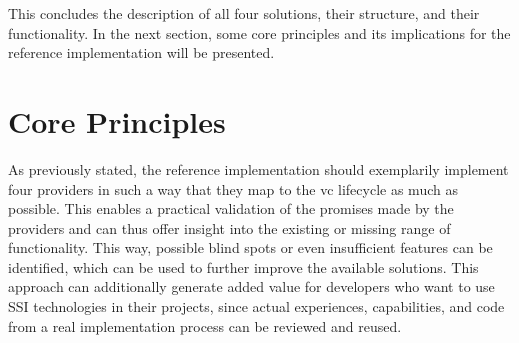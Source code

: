     This concludes the description of all four solutions, their structure, and their functionality. In the next section, some core principles and its implications for the reference implementation will be presented.
    \newpage

	\section{Core Principles}\label{section: core principles}
	
	As previously stated, the reference implementation should exemplarily implement four providers in such a way that they map to the \ac{vc} lifecycle as much as possible. This enables a practical validation of the promises made by the providers and can thus offer  insight into the existing or missing range of functionality. This way, possible blind spots or even insufficient features can be identified, which can be used to further improve the available solutions. This approach can additionally generate added value for developers who want to use \ac{SSI} technologies in their projects, since actual experiences, capabilities, and code from a real implementation process can be reviewed and reused.
    
